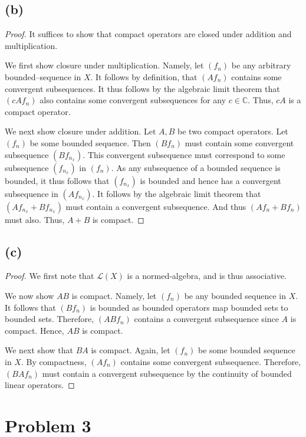 \documentclass[10pt]{article}
\begin{document}
\subsection*{(b)}

\begin{proof}
    It suffices to show that compact operators are closed under addition and multiplication.

    We first show closure under multiplication. Namely, let $(f_n)$ be any arbitrary bounded--sequence in $X.$ It follows by definition, that $(Af_n)$ contains some convergent subsequences. It thus follows by the algebraic limit theorem that $(cAf_n)$ also contains some convergent subsequences for any $c\in\mathbb{C}$. Thus, $cA$ is a compact operator.

    We next show closure under addition. Let $A, B$ be two compact operators. Let $(f_n)$ be some bounded sequence. Then $(Bf_n)$ must contain some convergent subsequence $(Bf_{n_x}).$ This convergent subsequence must correspond to some subsequence $(f_{n_x})$ in $(f_n).$ As any subsequence of a bounded sequence is bounded, it thus follows that $(f_{n_x})$ is bounded and hence has a convergent subsequence in $(Af_{n_x}).$ It follows by the algebraic limit theorem that $(Af_{n_x} + Bf_{n_x})$ must contain a convergent subsequence. And thus $(Af_{n} + Bf_{n})$ must also. Thus, $A+B$ is compact.
\end{proof}

\subsection*{(c)}

\begin{proof}
    We first note that $\mathscr{L}(X)$ is a normed-algebra, and is thus associative.

    We now show $AB$ is compact. Namely, let $(f_n)$ be any bounded sequence in $X.$ It follows that $(Bf_n)$ is bounded as bounded operators map bounded sets to bounded sets. Therefore, $(ABf_n)$ contains a convergent subsequence since $A$ is compact. Hence, $AB$ is compact.

    We next show that $BA$ is compact. Again, let $(f_n)$ be some bounded sequence in $X.$ By compactness, $(Af_n)$ contains some convergent subsequence. Therefore, $(BAf_n)$ must contain a convergent subsequence by the continuity of bounded linear operators.
\end{proof}

\section*{Problem 3}
\end{document}

